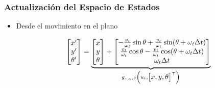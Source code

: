 \begin{frame}
    \frametitle{Actualización del Espacio de Estados}

    \begin{itemize}
        \item Desde el movimiento en el plano
        
        \begin{equation*}
            \begin{bmatrix} x' \\ y' \\ \theta' \end{bmatrix} = 
            \underbrace{\begin{bmatrix} x \\ y \\ \theta \end{bmatrix} + 
            \begin{bmatrix} 
            -\frac{v_t}{\omega_t} \sin \theta + \frac{v_t}{\omega_t} \sin (\theta + \omega_t \Delta t) \\ 
            \frac{v_t}{\omega_t} \cos \theta - \frac{v_t}{\omega_t} \cos (\theta + \omega_t \Delta t) \\ 
            \omega_t \Delta t 
            \end{bmatrix}}_{g_{x,y,\theta}\left(u_{t}, \begin{bmatrix} x, y, \theta \end{bmatrix}^{\top}\right)}
        \end{equation*}
    


\end{itemize}
\end{frame}
